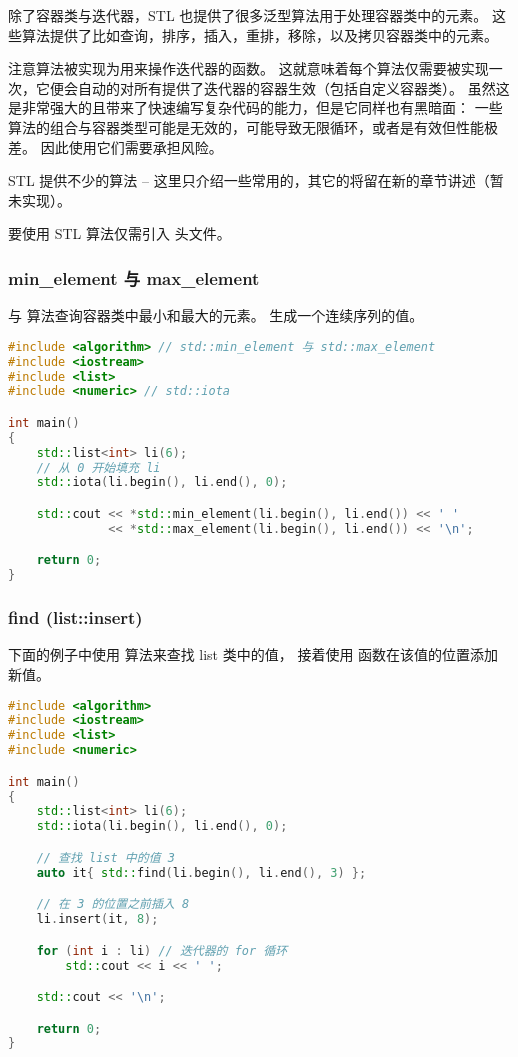 \documentclass[../../LearnCpp.tex]{subfiles}
\begin{document}

除了容器类与迭代器，STL 也提供了很多泛型算法用于处理容器类中的元素。
这些算法提供了比如查询，排序，插入，重排，移除，以及拷贝容器类中的元素。

注意算法被实现为用来操作迭代器的函数。
这就意味着每个算法仅需要被实现一次，它便会自动的对所有提供了迭代器的容器生效（包括自定义容器类）。
虽然这是非常强大的且带来了快速编写复杂代码的能力，但是它同样也有黑暗面：
一些算法的组合与容器类型可能是无效的，可能导致无限循环，或者是有效但性能极差。
因此使用它们需要承担风险。

STL 提供不少的算法 -- 这里只介绍一些常用的，其它的将留在新的章节讲述（暂未实现）。

要使用 STL 算法仅需引入  头文件。

\subsubsection*{min\_element 与 max\_element}

 与  算法查询容器类中最小和最大的元素。 生成一个连续序列的值。

\begin{lstlisting}[language=C++]
#include <algorithm> // std::min_element 与 std::max_element
#include <iostream>
#include <list>
#include <numeric> // std::iota

int main()
{
    std::list<int> li(6);
    // 从 0 开始填充 li
    std::iota(li.begin(), li.end(), 0);

    std::cout << *std::min_element(li.begin(), li.end()) << ' '
              << *std::max_element(li.begin(), li.end()) << '\n';

    return 0;
}
\end{lstlisting}

\subsubsection*{find (list::insert)}

下面的例子中使用  算法来查找 list 类中的值，
接着使用  函数在该值的位置添加新值。

\begin{lstlisting}[language=C++]
#include <algorithm>
#include <iostream>
#include <list>
#include <numeric>

int main()
{
    std::list<int> li(6);
    std::iota(li.begin(), li.end(), 0);

    // 查找 list 中的值 3
    auto it{ std::find(li.begin(), li.end(), 3) };

    // 在 3 的位置之前插入 8
    li.insert(it, 8);

    for (int i : li) // 迭代器的 for 循环
        std::cout << i << ' ';

    std::cout << '\n';

    return 0;
}
\end{lstlisting}
\end{document}
